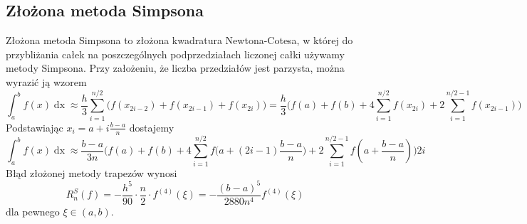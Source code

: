 \documentclass[11pt,wide]{article}
\begin{document}
\subsection{Złożona metoda Simpsona}
Złożona metoda Simpsona to złożona kwadratura Newtona-Cotesa, w której do przybliżania całek na poszczególnych podprzedziałach liczonej całki używamy metody Simpsona. Przy założeniu, że liczba przedziałów jest parzysta, można wyrazić ją wzorem
\begin{equation}
\int_a^b f(x)\mathop{dx} \approx \frac{h}{3}\sum_{i=1}^{n/2} \Bigg(f(x_{2i-2}) + f(x_{2i-1}) + f(x_{2i})\Bigg) = \frac{h}{3}\Bigg(f(a) + f(b) + 4\sum_{i=1}^{n/2} f(x_{2i}) + 2\sum_{i=1}^{n/2 - 1} f(x_{2i-1})\Bigg)
\end{equation}
Podstawiając \(\displaystyle x_i = a + i \frac{b-a}{n}\) dostajemy
\begin{equation} \label{wzor:WzorZlozonySimpsona}
\int_a^b f(x)\mathop{dx} \approx \frac{b-a}{3n}\Bigg(f(a) + f(b) + 4\sum_{i=1}^{n/2} f\bigg(a + (2i-1) \frac{b-a}{n}\bigg) + 2\sum_{i=1}^{n/2 - 1} f\left(a + \frac{b-a}{n}\right)\Bigg)2i 
\end{equation}
Błąd złożonej metody trapezów wynosi
\begin{equation} \label{wzor:BladZlozonySimpsona}
R_n^S(f) = - \frac{h^5}{90} \cdot \frac{n}{2} \cdot f^{(4)}(\xi) = - \frac{(b-a)^5}{2880n^4}f^{(4)}(\xi)
\end{equation}
dla pewnego \(\xi \in (a, b)\).
\end{document}
